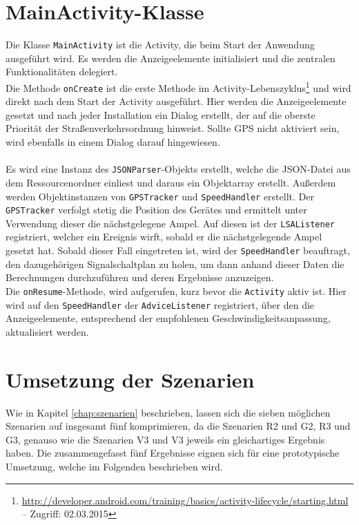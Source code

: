 \section{MainActivity-Klasse}
Die Klasse \texttt{MainActivity} ist die \gls{Activity}, die beim Start der Anwendung ausgeführt wird.  Es werden die Anzeigeelemente initialisiert und die zentralen Funktionalitäten delegiert.\\
Die Methode \texttt{onCreate} ist die erste Methode im \gls{Activity}-Lebenszyklus\footnote{ \url{http://developer.android.com/training/basics/activity-lifecycle/starting.html} -- Zugriff: 02.03.2015} und wird direkt nach dem Start der \gls{Activity} ausgeführt. Hier werden die Anzeigeelemente gesetzt und nach jeder Installation ein Dialog erstellt, der auf die oberste Priorität der Straßenverkehrsordnung hinweist. Sollte \gls{GPS} nicht aktiviert sein, wird ebenfalls in einem Dialog darauf hingewiesen.\\\\
Es wird eine Instanz des \texttt{JSONParser}-Objekts erstellt, welche die \gls{JSON}-Datei aus dem Ressourcenordner einliest und daraus ein Objektarray erstellt. Außerdem werden Objektinstanzen von \texttt{GPSTracker} und \texttt{SpeedHandler} erstellt. Der \texttt{GPSTracker} verfolgt stetig die Position des Gerätes und ermittelt unter Verwendung dieser die nächstgelegene Ampel. Auf diesen ist der \texttt{LSAListener} registriert, welcher ein Ereignis wirft, sobald er die nächstgelegende Ampel gesetzt hat. Sobald dieser Fall eingetreten ist, wird der \texttt{SpeedHandler} beauftragt, den dazugehörigen Signalschaltplan zu holen, um dann anhand dieser Daten die Berechnungen durchzuführen und deren Ergebnisse anzuzeigen.\\
Die \texttt{onResume}-Methode, wird aufgerufen, kurz bevor die \texttt{Activity} aktiv ist. Hier wird auf den \texttt{SpeedHandler} der \texttt{AdviceListener} registriert, über den die Anzeigeelemente, entsprechend der empfohlenen Geschwindigkeitsanpassung, aktualisiert werden. 
%
%
\section{Umsetzung der Szenarien}
Wie in Kapitel \ref{chap:szenarien} beschrieben, lassen sich die sieben möglichen Szenarien auf insgesamt fünf komprimieren, da die Szenarien R2 und G2, R3 und G3, genauso wie die Szenarien V3 und V3 jeweils ein gleichartiges Ergebnis haben. Die zusammengefasst fünf Ergebnisse eignen sich für eine prototypische Umsetzung, welche im Folgenden beschrieben wird.
%
%
